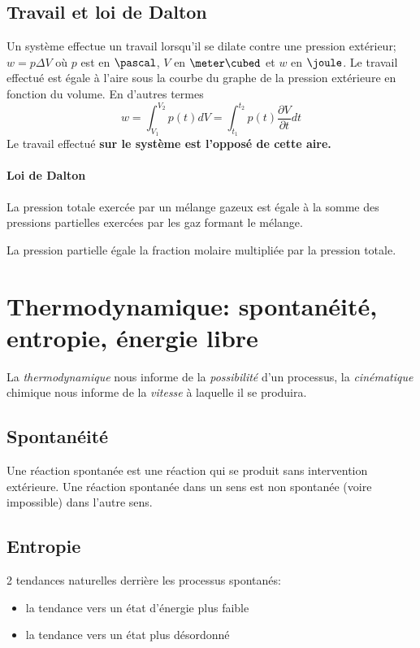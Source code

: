 \documentclass[11pt,a4paper,french]{article}
\renewcommand{\textbf}[1]{\begingroup\bfseries\mathversion{bold}#1\endgroup}
\begin{document}
\subsection{Travail et loi de Dalton}

Un système effectue un travail lorsqu'il se dilate contre une pression extérieur; $w=p\Delta V$
où $p$ est en $\pascal$, $V$ en $\meter\cubed$ et $w$ en $\joule$.
Le travail effectué est égale à l'aire sous la courbe du graphe de la pression extérieure en fonction du volume.
En d'autres termes
\[ w = \int_{V_1}^{V_2} p(t) dV = \int_{t_1}^{t_2} p(t) \frac{\partial V}{\partial t} dt \]
Le travail effectué \textbf{sur} le système est l'opposé de cette aire.

\paragraph{Loi de Dalton} La pression totale exercée par un mélange gazeux est égale à la somme des pressions partielles exercées par les gaz formant le mélange.

La pression partielle égale la fraction molaire multipliée par la pression totale.

\section{Thermodynamique: spontanéité, entropie, énergie libre}

La \emph{thermodynamique} nous informe de la \emph{possibilité} d'un processus, la \emph{cinématique} chimique nous informe de la \emph{vitesse} à laquelle il se produira.

\subsection{Spontanéité}

Une réaction spontanée est une réaction qui se produit sans intervention extérieure.
Une réaction spontanée dans un sens est non spontanée (voire impossible) dans l'autre sens.

\subsection{Entropie}

2 tendances naturelles derrière les processus spontanés:
\begin{itemize}
\item la tendance vers un état d'énergie plus faible
\item la tendance vers un état plus désordonné
\end{itemize}
\end{document}

